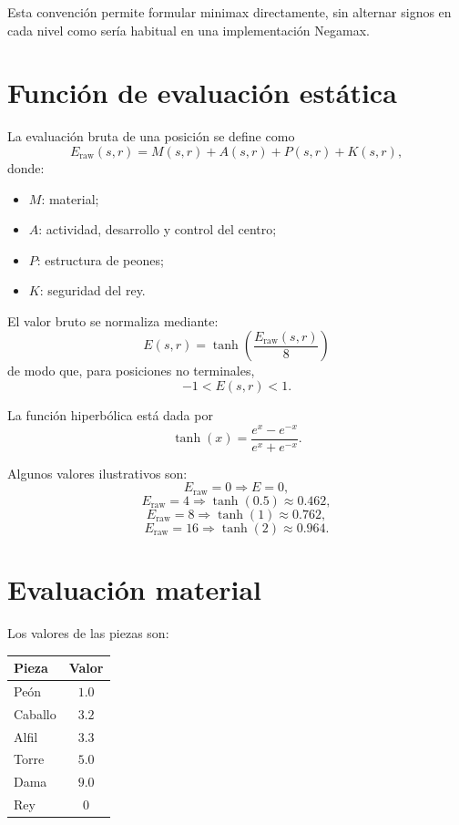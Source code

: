 \documentclass[11pt,a4paper]{article}
\begin{document}
Esta convención permite formular minimax directamente, sin alternar signos en
cada nivel como sería habitual en una implementación Negamax.

\section{Función de evaluación estática}

La evaluación bruta de una posición se define como
\[
E_{\mathrm{raw}}(s,r)
=
M(s,r)
+
A(s,r)
+
P(s,r)
+
K(s,r),
\]
donde:

\begin{itemize}
    \item $M$: material;
    \item $A$: actividad, desarrollo y control del centro;
    \item $P$: estructura de peones;
    \item $K$: seguridad del rey.
\end{itemize}

El valor bruto se normaliza mediante:
\[
\boxed{
E(s,r)
=
\tanh\left(
\frac{E_{\mathrm{raw}}(s,r)}{8}
\right)
}
\]
de modo que, para posiciones no terminales,
\[
-1<E(s,r)<1.
\]

La función hiperbólica está dada por
\[
\tanh(x)=\frac{e^x-e^{-x}}{e^x+e^{-x}}.
\]

Algunos valores ilustrativos son:
\[
E_{\mathrm{raw}}=0 \Rightarrow E=0,
\]
\[
E_{\mathrm{raw}}=4 \Rightarrow \tanh(0.5)\approx 0.462,
\]
\[
E_{\mathrm{raw}}=8 \Rightarrow \tanh(1)\approx 0.762,
\]
\[
E_{\mathrm{raw}}=16 \Rightarrow \tanh(2)\approx 0.964.
\]

\section{Evaluación material}

Los valores de las piezas son:

\begin{center}
\begin{tabular}{lc}
\toprule
Pieza & Valor \\
\midrule
Peón & $1.0$ \\
Caballo & $3.2$ \\
Alfil & $3.3$ \\
Torre & $5.0$ \\
Dama & $9.0$ \\
Rey & $0$ \\
\bottomrule
\end{tabular}
\end{center}
\end{document}
